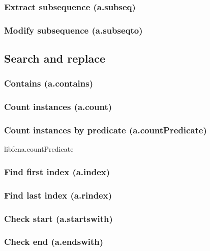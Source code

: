 \documentclass{article}
\theoremstyle{definition}
\begin{document}
\subsubsection{Extract subsequence (a.subseq)}

\subsubsection{Modify subsequence (a.subseqto)}

\subsection{Search and replace}

\subsubsection{Contains (a.contains)}

\subsubsection{Count instances (a.count)}

\subsubsection{Count instances by predicate (a.countPredicate)}
libfcn{a.countPredicate}

\subsubsection{Find first index (a.index)}

\subsubsection{Find last index (a.rindex)}

\subsubsection{Check start (a.startswith)}

\subsubsection{Check end (a.endswith)}
\end{document}
